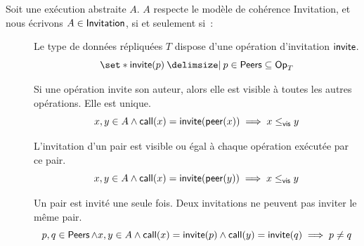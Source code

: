 \begin{definition}\label{def:invitation-consistency}
Soit une exécution abstraite $A$. $A$ respecte le modèle de cohérence Invitation, et nous écrivons $A \in \operatorname{\mathsf{Invitation}}$, si et seulement si~:
\begin{description}
  \item[]
  Le type de données répliquées $T$ dispose d'une opération d'invitation $\operatorname{\mathsf{invite}}$.
  \begin{equation*}
  \set*{\trm{invite}(p) \given p \in \trm{Peers}} \subseteq \trm{Op}_T
  \end{equation*}

  \item[]
  Si une opération invite son auteur, alors elle est visible à toutes les autres opérations.
  Elle est unique.
  \begin{equation*}
      x, y \in A \land \operatorname{\mathsf{call}}(x) = \operatorname{\mathsf{invite}}(\operatorname{\mathsf{peer}}(x)) \implies x \leq_{\operatorname{\mathsf{vis}}} y 
  \end{equation*}

  \item[]
  L'invitation d'un pair est visible ou égal à chaque opération exécutée par ce pair.
  \begin{equation*}
      x, y \in A \land \operatorname{\mathsf{call}}(x) = \operatorname{\mathsf{invite}}(\operatorname{\mathsf{peer}}(y)) \implies x \leq_{\operatorname{\mathsf{vis}}} y
  \end{equation*}

  \item[]
  Un pair est invité une seule fois.
  Deux invitations ne peuvent pas inviter le même pair.
  \begin{equation*}
      p, q \in \operatorname{\mathsf{Peers}} \land x, y \in A \land \operatorname{\mathsf{call}}(x) = \operatorname{\mathsf{invite}}(p) \land \operatorname{\mathsf{call}}(y) = \operatorname{\mathsf{invite}}(q) \implies p \neq q
  \end{equation*}
  \end{description}
\end{definition}

